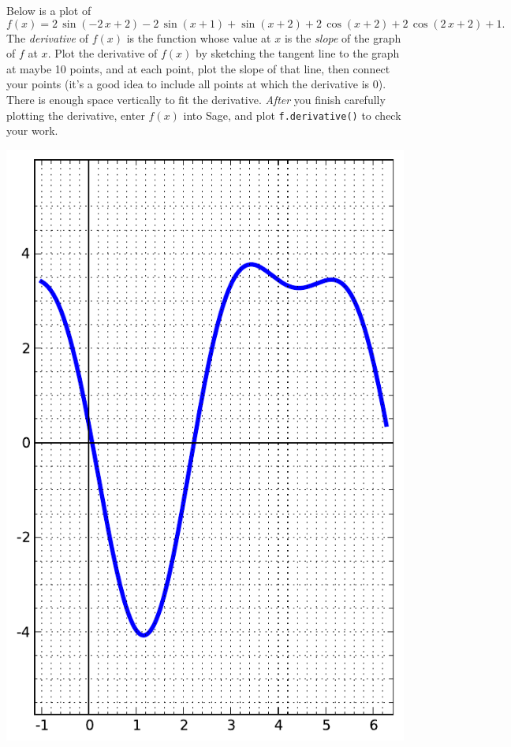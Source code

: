 Below is a plot of $$f(x)=2 \, \sin\left(-2 \, x + 2\right) - 2 \, \sin\left(x + 1\right) + \sin\left(x + 2\right) + 2 \, \cos\left(x + 2\right) + 2 \, \cos\left(2 \, x + 2\right) + 1.$$  The {\em \color{red}derivative} of $f(x)$ is the function whose value at $x$ is the {\em slope} of the graph of $f$ at $x$.  Plot the derivative of $f(x)$ by sketching the tangent line to the graph at maybe 10 points, and at each point, plot the slope of that line, then connect your points (it's a good idea to include all points at which the derivative is 0).  There is enough space vertically to fit the derivative.  {\em After} you finish carefully plotting the derivative, enter $f(x)$ into Sage, and plot {\color{blue}\verb|f.derivative()|} to check your work.
\begin{center}\includegraphics{functions/12.pdf}\end{center}\newpage

